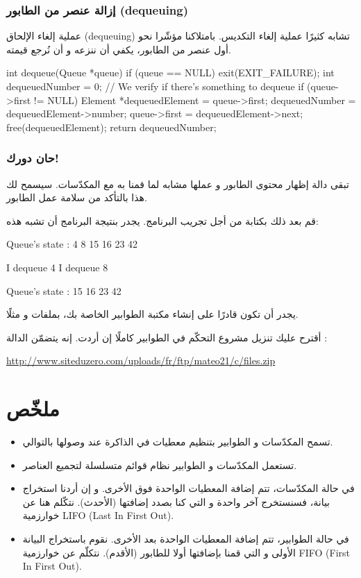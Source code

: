 \subsubsection{إزالة عنصر من الطابور (\textenglish{dequeuing})}

عملية إلغاء الإلحاق 
(\textenglish{dequeuing})
تشابه كثيرًا عملية إلغاء التكديس. بامتلاكنا مؤشّرا نحو أول عنصر من الطابور، يكفي أن ننزعه و أن نُرجع قيمته.

\begin{Csource}
int dequeue(Queue *queue)
{
	if (queue == NULL)
	{
		exit(EXIT_FAILURE);
	}
	int dequeuedNumber = 0;
	// We verify if there's something to dequeue
	if (queue->first != NULL)
	{
		Element *dequeuedElement = queue->first;
		dequeuedNumber = dequeuedElement->number;
		queue->first = dequeuedElement->next;
		free(dequeuedElement);
	}
	return dequeuedNumber;
}
\end{Csource}

\subsubsection{حان دورك!}

تبقى دالة إظهار محتوى الطابور
و عملها مشابه لما قمنا به مع المكدّسات. سيسمح لك هذا بالتأكد من سلامة عمل الطابور.

قم بعد ذلك بكتابة
من أجل تجريب البرنامج. يجدر بنتيجة البرنامج أن تشبه هذه:

\begin{Console}
Queue's state :
4 8 15 16 23 42

I dequeue 4
I dequeue 8

Queue's state :
15 16 23 42
\end{Console}

يجدر أن تكون قادرًا على إنشاء مكتبة الطوابير الخاصة بك، بملفات
و
مثلًا.

أقترح عليك تنزيل مشروع التحكّم في الطوابير كاملًا إن أردت. إنه يتضمّن الدالة
:

\url{http://www.siteduzero.com/uploads/fr/ftp/mateo21/c/files.zip}

\section*{ملخّص}

\begin{itemize}
	\item تسمح المكدّسات و الطوابير بتنظيم معطيات في الذاكرة عند وصولها بالتوالي.
	\item تستعمل المكدّسات و الطوابير نظام قوائم متسلسلة لتجميع العناصر.
	\item في حالة المكدّسات، تتم إضافة المعطيات الواحدة فوق الأخرى. و إن أردنا استخراج بيانة، فسنستخرج آخر واحدة و التي كنا بصدد إضافتها (الأحدث). نتكّلم هنا عن خوارزمية 
	\textenglish{LIFO} (\textenglish{Last In First Out}).
	\item في حالة الطوابير، تتم إضافة المعطيات الواحدة بعد الأخرى. نقوم باستخراج البيانة الأولى و التي قمنا بإضافتها أولا للطابور (الأقدم). نتكلّم عن خوارزمية
	\textenglish{FIFO} (\textenglish{First In First Out}).
\end{itemize}
